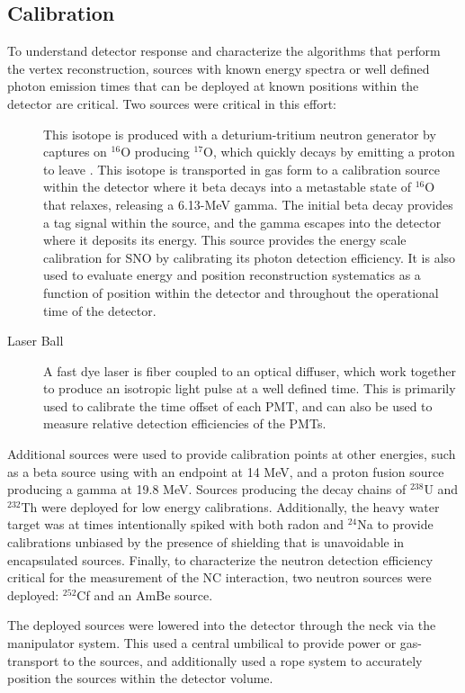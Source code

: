 \subsection{Calibration}

To understand detector response and characterize the algorithms that perform the vertex reconstruction, sources with known energy spectra or well defined photon emission times that can be deployed at known positions within the detector are critical.
Two sources were critical in this effort:
\begin{description}
\item[\N \cite{sno_n16}] This isotope is produced with a deturium-tritium neutron generator by captures on $^{16}$O producing $^{17}$O, which quickly decays by emitting a proton to leave \N. This isotope is transported in gas form to a calibration source within the detector where it beta decays into a metastable state of $^{16}$O that relaxes, releasing a 6.13-MeV gamma. The initial beta decay provides a tag signal within the source, and the gamma escapes into the detector where it deposits its energy. This source provides the energy scale calibration for SNO by calibrating its photon detection efficiency. It is also used to evaluate energy and position reconstruction systematics as a function of position within the detector and throughout the operational time of the detector.
\item[Laser Ball \cite{sno_laserball}] A fast dye laser is fiber coupled to an optical diffuser, which work together to produce an isotropic light pulse at a well defined time. This is primarily used to calibrate the time offset of each PMT, and can also be used to measure relative detection efficiencies of the PMTs.
\end{description}
Additional sources were used to provide calibration points at other energies, such as a beta source using \Li \cite{Tagg:2002} with an endpoint at 14 MeV, and a proton fusion source \cite{fusion_source} producing a gamma at 19.8 MeV.
Sources producing the decay chains of $^{238}$U and $^{232}$Th were deployed for low energy calibrations.
Additionally, the heavy water target was at times intentionally spiked with both radon and $^{24}$Na to provide calibrations unbiased by the presence of shielding that is unavoidable in encapsulated sources.
Finally, to characterize the neutron detection efficiency critical for the measurement of the NC interaction, two neutron sources were deployed: $^{252}$Cf and an AmBe source.

The deployed sources were lowered into the detector through the neck via the manipulator system.
This used a central umbilical to provide power or gas-transport to the sources, and additionally used a rope system to accurately position the sources within the detector volume.

